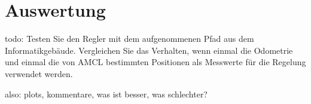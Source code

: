 \documentclass[11pt,a4paper]{article}
\begin{document}

\section{Auswertung}
todo: 
Testen Sie den Regler mit dem aufgenommenen Pfad aus dem Informatikgebäude. Vergleichen Sie das Verhalten, wenn einmal die Odometrie und einmal die von AMCL bestimmten
Positionen als Messwerte für die Regelung verwendet werden.

also: plots, kommentare, was ist besser, was schlechter?

\end{document}
